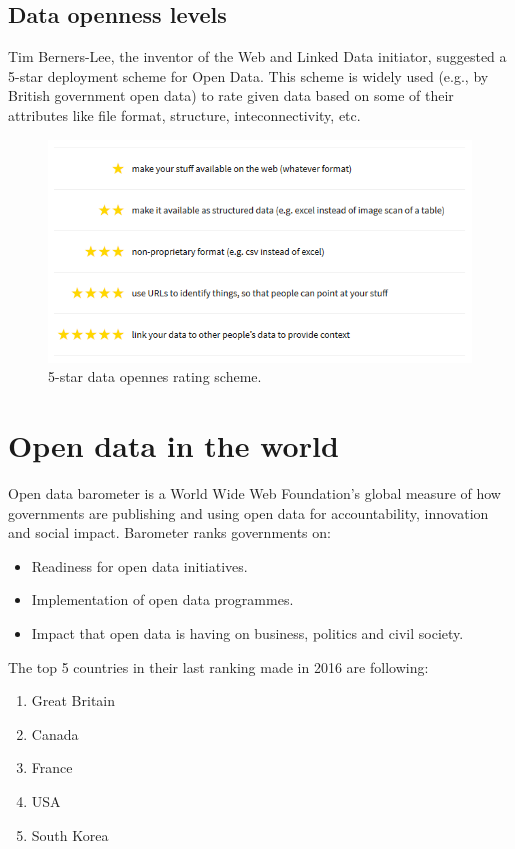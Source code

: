 \documentclass[thesis=B,english]{FITthesis}[2012/06/26]
\begin{document}
	\subsection{Data openness levels}
	Tim Berners-Lee, the inventor of the Web and Linked Data initiator, suggested a 5-star deployment scheme for Open Data. This scheme is widely used (e.g., by British government open data) to rate given data based on some of their attributes like file format, structure, inteconnectivity, etc.
\begin{figure}[h!]
  \includegraphics[width=\linewidth]{pictures/5starRating.png}
  \caption{5-star data opennes rating scheme. \cite{5stardata}}
  \label{fig:5-star}
\end{figure}

	\section{Open data in the world}
	Open data barometer is a World Wide Web Foundation's global measure of how governments are publishing and using open data for accountability, innovation and social impact. Barometer ranks governments on:
\begin{itemize}
	\item Readiness for open data initiatives.
	\item Implementation of open data programmes.
	\item Impact that open data is having on business, politics and civil society.\cite{opendatabarometer}
\end{itemize}
The top 5 countries in their last ranking made in 2016 are following:
	\begin{enumerate}
  \item Great Britain
  \item Canada
  \item France
  \item USA
  \item South Korea
  \end{enumerate}
\end{document}
